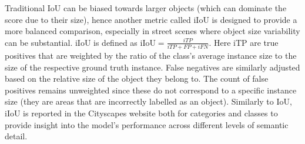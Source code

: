 Traditional IoU can be biased towards larger objects (which can dominate the score due to their size), hence another metric called iIoU is designed to provide a more balanced comparison, especially in street scenes where object size variability can be substantial. iIoU is defined as $\text{iIoU} = \frac{iTP}{iTP + FP + iFN}$. Here iTP are true positives that are weighted by the ratio of the class's average instance size to the size of the respective ground truth instance. False negatives are similarly adjusted based on the relative size of the object they belong to. The count of false positives remains unweighted since these do not correspond to a specific instance size (they are areas that are incorrectly labelled as an object). Similarly to IoU, iIoU is reported in the Cityscapes website both for categories and classes to provide insight into the model's performance across different levels of semantic detail.